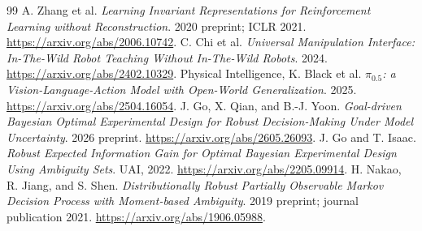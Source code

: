 \documentclass[11pt]{article}
\begin{document}
\begin{thebibliography}{99}
 A. Zhang et al. \emph{Learning Invariant Representations for Reinforcement Learning without Reconstruction}. 2020 preprint; ICLR 2021. \url{https://arxiv.org/abs/2006.10742}.
 C. Chi et al. \emph{Universal Manipulation Interface: In-The-Wild Robot Teaching Without In-The-Wild Robots}. 2024. \url{https://arxiv.org/abs/2402.10329}.
 Physical Intelligence, K. Black et al. \emph{$\pi_{0.5}$: a Vision-Language-Action Model with Open-World Generalization}. 2025. \url{https://arxiv.org/abs/2504.16054}.
 J. Go, X. Qian, and B.-J. Yoon. \emph{Goal-driven Bayesian Optimal Experimental Design for Robust Decision-Making Under Model Uncertainty}. 2026 preprint. \url{https://arxiv.org/abs/2605.26093}.
 J. Go and T. Isaac. \emph{Robust Expected Information Gain for Optimal Bayesian Experimental Design Using Ambiguity Sets}. UAI, 2022. \url{https://arxiv.org/abs/2205.09914}.
 H. Nakao, R. Jiang, and S. Shen. \emph{Distributionally Robust Partially Observable Markov Decision Process with Moment-based Ambiguity}. 2019 preprint; journal publication 2021. \url{https://arxiv.org/abs/1906.05988}.
\end{thebibliography}
\end{document}
